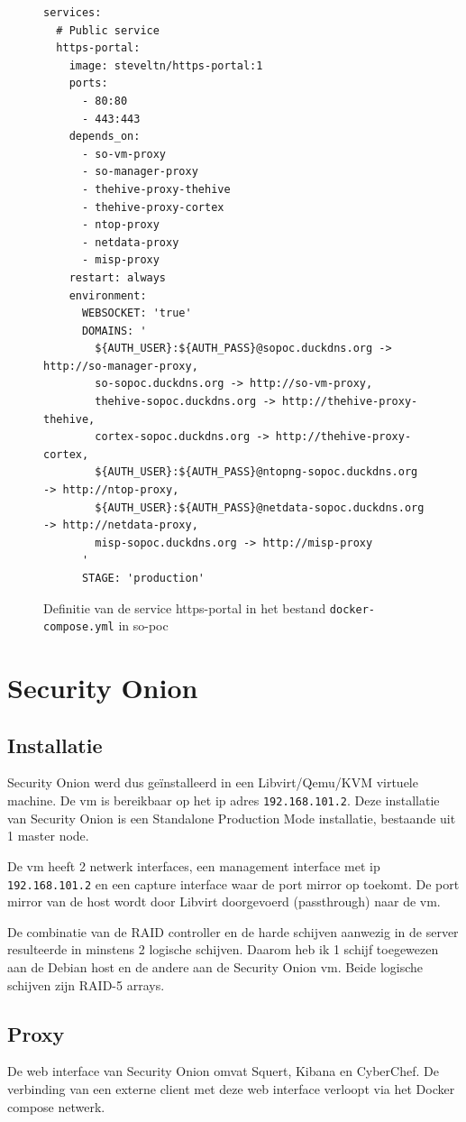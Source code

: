 \documentclass[a4paper,12pt]{report}
\begin{document}
\begin{figure}[H]
  \begin{lstlisting}
services:
  # Public service
  https-portal:
    image: steveltn/https-portal:1
    ports:
      - 80:80
      - 443:443
    depends_on:
      - so-vm-proxy
      - so-manager-proxy
      - thehive-proxy-thehive
      - thehive-proxy-cortex
      - ntop-proxy
      - netdata-proxy
      - misp-proxy
    restart: always
    environment:
      WEBSOCKET: 'true'
      DOMAINS: '
        ${AUTH_USER}:${AUTH_PASS}@sopoc.duckdns.org -> http://so-manager-proxy,
        so-sopoc.duckdns.org -> http://so-vm-proxy,
        thehive-sopoc.duckdns.org -> http://thehive-proxy-thehive,
        cortex-sopoc.duckdns.org -> http://thehive-proxy-cortex,
        ${AUTH_USER}:${AUTH_PASS}@ntopng-sopoc.duckdns.org -> http://ntop-proxy,
        ${AUTH_USER}:${AUTH_PASS}@netdata-sopoc.duckdns.org -> http://netdata-proxy,
        misp-sopoc.duckdns.org -> http://misp-proxy
      '
      STAGE: 'production'
  \end{lstlisting}
  \caption{Definitie van de service https-portal in het bestand \lstinline|docker-compose.yml| in so-poc}
  \label{fig:https-portal-compose}
\end{figure}

\section{Security Onion}
\subsection{Installatie}
Security Onion werd dus geïnstalleerd in een Libvirt/Qemu/KVM virtuele machine.
De vm is bereikbaar op het ip adres \lstinline|192.168.101.2|.
Deze installatie van Security Onion is een Standalone Production Mode installatie, bestaande uit 1 master node.

De vm heeft 2 netwerk interfaces, een management interface met ip \lstinline|192.168.101.2| en een capture interface waar de port mirror op toekomt.
De port mirror van de host wordt door Libvirt doorgevoerd (passthrough) naar de vm.

De combinatie van de RAID controller en de harde schijven aanwezig in de server resulteerde in minstens 2 logische schijven.
Daarom heb ik 1 schijf toegewezen aan de Debian host en de andere aan de Security Onion vm.
Beide logische schijven zijn RAID-5 arrays.

\subsection{Proxy}
De web interface van Security Onion omvat Squert, Kibana en CyberChef.
De verbinding van een externe client met deze web interface verloopt via het Docker compose netwerk.
\end{document}
